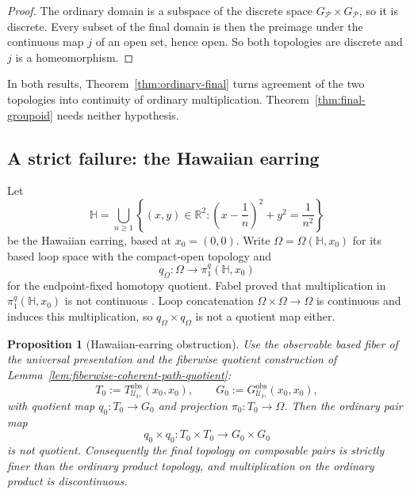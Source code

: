 \documentclass[10pt,reqno]{amsart}
\theoremstyle{definition}
\theoremstyle{plain}
\newtheorem{proposition}[definition]{Proposition}
\theoremstyle{remark}
\begin{document}
\begin{proof}
The ordinary domain is a subspace of the discrete space
$G_{\mathcal P}\times G_{\mathcal P}$, so it is discrete.  Every subset of the
final domain is then the preimage under the continuous map $j$ of an open
set, hence open.  So both topologies are discrete and $j$ is a
homeomorphism.
\end{proof}

In both results, Theorem~\ref{thm:ordinary-final} turns agreement of the two
topologies into continuity of ordinary multiplication.
Theorem~\ref{thm:final-groupoid} needs neither hypothesis.

\subsection{A strict failure: the Hawaiian earring}

Let
\[
  \mathbb H=\bigcup_{n\geq 1}
  \left\{(x,y)\in\mathbb R^2:
  \left(x-\frac1n\right)^2+y^2=\frac1{n^2}\right\}
\]
be the Hawaiian earring, based at $x_0=(0,0)$.  Write
$\Omega=\Omega(\mathbb H,x_0)$ for its based loop space with the compact-open
topology and
\[
  q_\Omega:\Omega\longrightarrow\pi_1^q(\mathbb H,x_0)
\]
for the endpoint-fixed homotopy quotient.  Fabel proved that multiplication
in $\pi_1^q(\mathbb H,x_0)$ is not continuous \cite{Fabel11}.  Loop
concatenation $\Omega\times\Omega\to\Omega$ is continuous and induces this
multiplication, so $q_\Omega\times q_\Omega$ is not a quotient map either.

\begin{proposition}[Hawaiian-earring obstruction]
\label{prop:hawaiian-earring}
Use the observable based fiber of the universal presentation and the
fiberwise quotient construction of Lemma~\ref{lem:fiberwise-coherent-path-quotient}:
\[
  T_0:=T_{\mathcal U_{\mathbb H}}^{\mathrm{obs}}(x_0,x_0),
  \qquad
  G_0:=G_{\mathcal U_{\mathbb H}}^{\mathrm{obs}}(x_0,x_0),
\]
with quotient map $q_0:T_0\to G_0$ and projection
$\pi_0:T_0\to\Omega$.  Then the ordinary
pair map
\[
  q_0\times q_0:T_0\times T_0\longrightarrow G_0\times G_0
\]
is not quotient.  Consequently the final topology on composable pairs is
strictly finer than the ordinary product topology, and multiplication on the
ordinary product is discontinuous.
\end{proposition}
\end{document}
